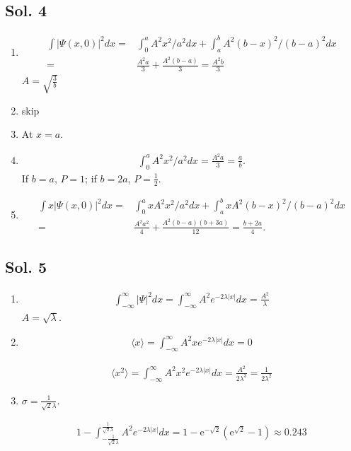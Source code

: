 \subsection*{Sol. 4}
\begin{enumerate}
    \item 
    \begin{align*}
        \int|\Psi(x,0)|^2dx = &
        \int_0^aA^2x^2/a^2dx + 
        \int_a^b A^2(b-x)^2/(b-a)^2dx\\
        = & \frac{A^2a}{3} + \frac{A^2(b-a)}{3} = \frac{A^2b}{3}
    \end{align*}
    $A = \sqrt{\frac{3}{b}}$
    \item skip
    \item At  $x=a$.
    \item 
    \begin{align*}
        \int_0^a A^2x^2/a^2dx=\frac{A^2a}{3} = \frac{a}{b}.
    \end{align*}
    If $b=a$, $P=1$; if $b=2a$, $P=\frac{1}{2}$.
    \item 
    \begin{align*}
        \int x|\Psi(x,0)|^2dx = &
        \int_0^a xA^2x^2/a^2dx + 
        \int_a^b xA^2(b-x)^2/(b-a)^2dx\\
        = & \frac{A^2a^2}{4} + \frac{A^2(b-a)(b+3a)}{12} = \frac{b+2a}{4}.
    \end{align*}
\end{enumerate}

\subsection*{Sol. 5}
\begin{enumerate}
    \item 
    \begin{align*}
    \int_{-\infty}^{\infty} |\Psi|^2 dx= 
        \int_{-\infty}^{\infty}
        A^2e^{-2\lambda|x|} dx= \frac{A^2}{\lambda}
    \end{align*}
    $A = \sqrt{\lambda}$.
    \item 
    \begin{align*}
        \langle x\rangle = 
        \int_{-\infty}^{\infty}
        A^2xe^{-2\lambda|x|} dx = 0
    \end{align*}

    \begin{align*}
    \langle x^2\rangle = 
        \int_{-\infty}^{\infty}
        A^2x^2e^{-2\lambda|x|} dx = \frac{A^2}{2\lambda^3} = \frac{1}{2\lambda^2}
    \end{align*}
    \item 
    $\sigma = \frac{1}{\sqrt{2}\lambda}$.


    \begin{align*}
        1 - \int_{-\frac{1}{\sqrt{2}\lambda}}^{\frac{1}{\sqrt{2}\lambda}}
        A^2e^{-2\lambda|x|}dx = 1 - \mathrm{e}^{-\sqrt{2}} \left(\mathrm{e}^{\sqrt{2}} - 1\right) \approx 0.243
    \end{align*}
\end{enumerate}

